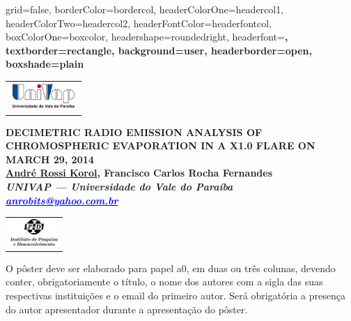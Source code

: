 \documentclass[a0paper,portrait]{baposter}
\begin{document}
\begin{poster}
{grid=false,
borderColor=bordercol, %
headerColorOne=headercol1, %
headerColorTwo=headercol2, %
headerFontColor=headerfontcol, %
boxColorOne=boxcolor, %
headershape=roundedright, %
headerfont=\Large\sf\bf, %
textborder=rectangle,
background=user,
headerborder=open, %
boxshade=plain
}
{\begin{tabular}{c}
        \includegraphics[height=1cm]{UNIVAP-SF.png}\\
\end{tabular}
}  
%
%
{\bf  \LARGE {DECIMETRIC RADIO EMISSION ANALYSIS OF CHROMOSPHERIC EVAPORATION IN A X1.0 FLARE ON MARCH 29, 2014} \\ %
\vspace{0.2cm} 
\footnotesize \underline{André Rossi Korol}, Francisco Carlos Rocha Fernandes\\  %
\footnotesize \it UNIVAP --- Universidade do Vale do Paraíba\\ %
\footnotesize \it \textcolor{blue}{\underline{anrobits@yahoo.com.br}}\/}

{\begin{tabular}{c}
        \includegraphics[height=1cm]{ipd2-sf.png}
\end{tabular}
}  

{O pôster deve ser elaborado para papel a0, em duas ou três colunas, devendo conter, obrigatoriamente o título, o nome dos autores com a sigla das suas respectivas instituições e o email do primeiro autor. 
Será obrigatória a presença do autor apresentador durante a apresentação do pôster.


}
\end{poster}
\end{document}
